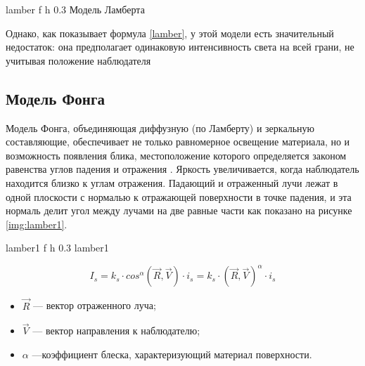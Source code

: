 	{lamber} %
	{f} %
	{h} %
	{0.3\textwidth} %
	{Модель Ламберта} %

Однако, как показывает формула \ref{lamber}, у этой модели есть значительный недостаток: она предполагает одинаковую интенсивность света на всей грани, не учитывая положение наблюдателя


\subsection{Модель Фонга}

Модель Фонга, объединяющая диффузную (по Ламберту) и зеркальную составляющие, обеспечивает не только равномерное освещение материала, но и возможность появления блика, местоположение которого определяется законом равенства углов падения и отражения \cite{lightmodfv}. Яркость увеличивается, когда наблюдатель находится близко к углам отражения. Падающий и отраженный лучи лежат в одной плоскости с нормалью к отражающей поверхности в точке падения, и эта нормаль делит угол между лучами на две равные части как показано на рисунке \ref{img:lamber1}.

{lamber1} %
{f} %
{h} %
{0.3\textwidth} %
{lamber1} %


\begin{equation}
	I_{s}=k_{s} \cdot cos^{\alpha}(\vec R, \vec V) \cdot i_{s} = k_{s} \cdot (\vec R, \vec V)^{\alpha} \cdot i_{s}
\end{equation}

\begin{itemize}
	\item $\vec R$ --- вектор отраженного луча;
	\item $\vec V$ --- вектор направления к наблюдателю;
	\item $\alpha$ ---коэффициент блеска, характеризующий материал поверхности.
\end{itemize}


